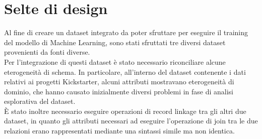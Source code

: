 \section{Selte di design}
\label{sec:design}
Al fine di creare un dataset integrato da poter sfruttare per eseguire il training del modello di Machine Learning, sono stati sfruttati tre diversi dataset provenienti da fonti diverse.\\
Per l'integrazione di questi dataset è stato necessario riconciliare alcune eterogeneità di schema. In particolare, all'interno del dataset contenente i dati relativi ai progetti Kickstarter, alcuni attributi mostravano eterogeneità di dominio, che hanno causato inizialmente diversi problemi in fase di analisi esplorativa del dataset.\\
È stato inoltre necessario eseguire operazioni di record linkage tra gli altri due dataset, in quanto gli attributi necessari ad eseguire l'operazione di join tra le due relazioni erano rappresentati mediante una sintassi simile ma non identica.